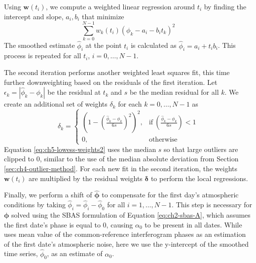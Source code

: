 Using $ \bm{w}(t_i) $, we compute a weighted linear regression around $t_i$ by finding the intercept and slope, $a_i, b_i$ that minimize
\begin{equation}
	\sum_{k=0}^{N-1} w_k(t_i) \left(\phi_k - a_i - b_i t_k \right)^2
\end{equation}
The smoothed estimate $\hat{\phi}_i$ at the point $t_i$ is calculated as $\hat{\phi}_i = a_i + t_i b_i$. This process is repeated for all $t_i$,  $i = 0, \ldots, N-1$.

The second iteration performs another weighted least squares fit, this time further downweighting based on the residuals of the first iteration.
Let $\epsilon_k = \left| \hat{\phi}_k - \phi_k  \right|$ be the residual at $t_k$ and $s$ be the median residual for all $k$. We create an additional set of weights $ \delta_k $ for each $ k = 0, \ldots, N-1$ as
\begin{equation}
	\delta_k = 
	\begin{cases}
		\left( 1 - \left(\frac{ \hat{\phi}_k - \phi_k }{6 s} \right)^2 \right)^2 , & \text{if}\  \left( \frac{ \hat{\phi}_k - \phi_k }{6s} \right) < 1 \\
		0, & \text{otherwise}
	\end{cases}          \label{eq:ch5-lowess-weights2}
\end{equation}
Equation \eqref{eq:ch5-lowess-weights2} uses the median $ s $ so that large outliers are clipped to 0, similar to the use of the median absolute deviation from Section \ref{sec:ch4-outlier-method}. For each new fit in the second iteration, the weights $ \bm{w}(t_i) $ are multiplied by the residual weights $\bm{\delta}$ to perform the local regressions.

Finally, we perform a shift of $ \bm{\hat{\phi}} $ to compensate for the first day's atmospheric conditions by taking $ \hat{\phi}_i = \hat{\phi}_i - \hat{\phi}_0 $ for all $ i = 1, \ldots, N-1 $.
This step is necessary for $ \bm{\phi} $ solved using the SBAS formulation of Equation \eqref{eq:ch2-sbas-A}, which assumes the first date's phase is equal to 0, causing $ \alpha_0 $ to be present in all dates.
While \cite{Ferretti2000NonlinearSubsidenceRate} uses mean value of the common-reference interferogram phases as an estimation of the first date's atmospheric noise, here we use the y-intercept of the smoothed time series, $ \hat{\phi}_0 $, as an estimate of $ \alpha_0 $. 



